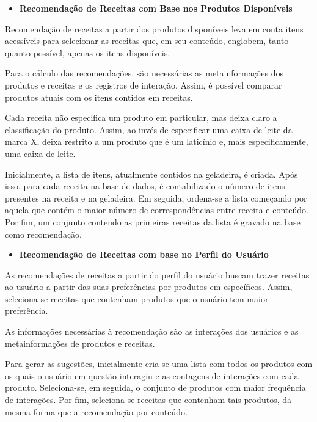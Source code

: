 \begin{itemize}
    \item \textbf{Recomendação de Receitas com Base nos Produtos Disponíveis}
\end{itemize}

Recomendação de receitas a partir dos produtos disponíveis leva em conta itens acessíveis para selecionar as receitas que, em seu conteúdo, englobem, tanto quanto possível, apenas os itens disponíveis.

Para o cálculo das recomendações, são necessárias as metainformações dos produtos e receitas e os registros de interação. Assim, é possível comparar produtos atuais com os itens contidos em receitas.

Cada receita não especifica um produto em particular, mas deixa claro a classificação do produto. Assim, ao invés de especificar uma caixa de leite da marca X, deixa restrito a um produto que é um laticínio e, mais especificamente, uma caixa de leite.

Inicialmente, a lista de itens, atualmente contidos na geladeira, é criada. Após isso, para cada receita na base de dados, é contabilizado o número de itens presentes na receita e na geladeira. Em seguida, ordena-se a lista começando por aquela que contém o maior número de correspondências entre receita e conteúdo. Por fim, um conjunto contendo as primeiras receitas da lista é gravado na base como recomendação.

\begin{itemize} 
    \item \textbf{Recomendação de Receitas com base no Perfil do Usuário}
\end{itemize}

As recomendações de receitas a partir do perfil do usuário buscam trazer receitas ao usuário a partir das suas preferências por produtos em específicos. Assim, seleciona-se receitas que contenham produtos que o usuário tem maior preferência.

As informações necessárias à recomendação são as interações dos usuários e as metainformações de produtos e receitas.

Para gerar as sugestões, inicialmente cria-se uma lista com todos os produtos com os quais o usuário em questão interagiu e as contagens de interações com cada produto. Seleciona-se, em seguida, o conjunto de produtos com maior frequência de interações. Por fim, seleciona-se receitas que contenham tais produtos, da mesma forma que a recomendação por conteúdo.


